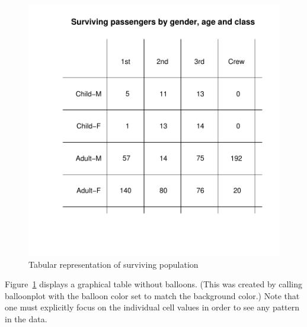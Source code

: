 \documentclass[a4paper]{report}
\begin{document}
\begin{article}
\begin{figure}
\includegraphics[width=\textwidth]{SurvivedPopWhite.pdf}
\vspace*{-0.25in}
\caption{\label{figure:Surv.Pop.White}
Tabular representation of surviving population}
\end{figure}

Figure~\ref{figure:Surv.Pop.White} displays a graphical table
without balloons.  (This was created by calling balloonplot with the
balloon color set to match the background color.)  Note that one
must explicitly focus on the individual cell values in order to see
any pattern in the data.


\end{article}
\end{document}
